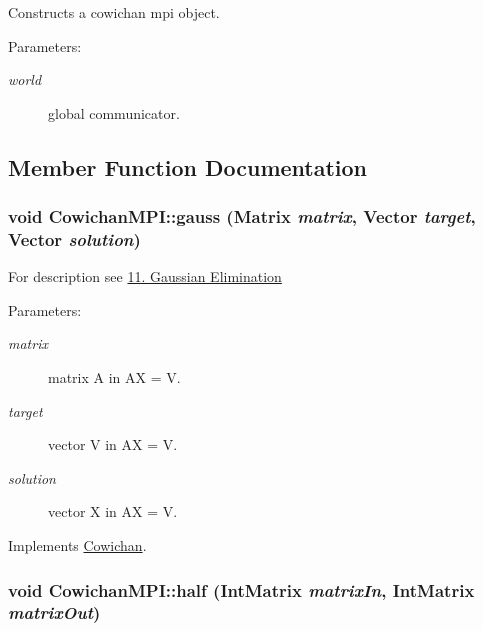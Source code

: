 Constructs a cowichan mpi object. \begin{Desc}
\item[Parameters:]
\begin{description}
\item[{\em world}]global communicator. \end{description}
\end{Desc}


\subsection{Member Function Documentation}
\hypertarget{class_cowichan_m_p_i_975f8da6c166fe1db3cf9341eeaab000}{
\subsubsection[{gauss}]{\setlength{\rightskip}{0pt plus 5cm}void CowichanMPI::gauss ({\bf Matrix} {\em matrix}, \/  {\bf Vector} {\em target}, \/  {\bf Vector} {\em solution})}}
\label{class_cowichan_m_p_i_975f8da6c166fe1db3cf9341eeaab000}


For description see \hyperlink{index_gauss_sec}{11. Gaussian Elimination} \begin{Desc}
\item[Parameters:]
\begin{description}
\item[{\em matrix}]matrix A in AX = V. \item[{\em target}]vector V in AX = V. \item[{\em solution}]vector X in AX = V. \end{description}
\end{Desc}


Implements \hyperlink{class_cowichan_aa9aac74b96dc5ed33e821d94649d1b2}{Cowichan}.\hypertarget{class_cowichan_m_p_i_154bbd1a400ee4571f761bff1cdf67cd}{
\subsubsection[{half}]{\setlength{\rightskip}{0pt plus 5cm}void CowichanMPI::half ({\bf IntMatrix} {\em matrixIn}, \/  {\bf IntMatrix} {\em matrixOut})}}
\label{class_cowichan_m_p_i_154bbd1a400ee4571f761bff1cdf67cd}



